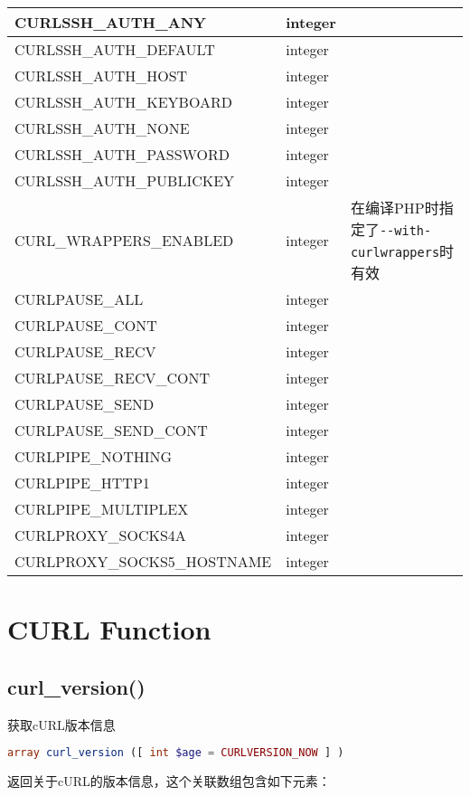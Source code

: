 \begin{longtable}{|m{150pt}|m{40pt}|m{200pt}|}
\hline
CURLSSH\_AUTH\_ANY&integer&\\
\hline
CURLSSH\_AUTH\_DEFAULT&integer&\\
\hline
CURLSSH\_AUTH\_HOST&integer&\\
\hline
CURLSSH\_AUTH\_KEYBOARD&integer&\\
\hline
CURLSSH\_AUTH\_NONE&integer&\\
\hline
CURLSSH\_AUTH\_PASSWORD&integer&\\
\hline
CURLSSH\_AUTH\_PUBLICKEY&integer&\\
\hline
CURL\_WRAPPERS\_ENABLED&integer&在编译PHP时指定了\texttt{-\/-with-curlwrappers}时有效\\
\hline
CURLPAUSE\_ALL&integer&\\
\hline
CURLPAUSE\_CONT&integer&\\
\hline
CURLPAUSE\_RECV&integer&\\
\hline
CURLPAUSE\_RECV\_CONT&integer&\\
\hline
CURLPAUSE\_SEND&integer&\\
\hline
CURLPAUSE\_SEND\_CONT&integer&\\
\hline
CURLPIPE\_NOTHING&integer&\\
\hline
CURLPIPE\_HTTP1&integer&\\
\hline
CURLPIPE\_MULTIPLEX&integer&\\
\hline
CURLPROXY\_SOCKS4A&integer&\\
\hline
CURLPROXY\_SOCKS5\_HOSTNAME&integer&\\
\hline
\end{longtable}


\chapter{CURL Function}


\section{curl\_version()}

获取cURL版本信息

\begin{lstlisting}[language=PHP]
array curl_version ([ int $age = CURLVERSION_NOW ] )
\end{lstlisting}

返回关于cURL的版本信息，这个关联数组包含如下元素：


